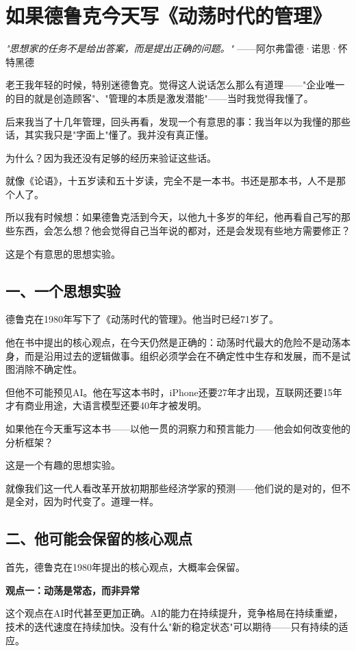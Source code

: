 \chapter{如果德鲁克今天写《动荡时代的管理》}


\textit{"思想家的任务不是给出答案，而是提出正确的问题。"}
——阿尔弗雷德·诺思·怀特黑德


老王我年轻的时候，特别迷德鲁克。觉得这人说话怎么那么有道理——"企业唯一的目的就是创造顾客"、"管理的本质是激发潜能"——当时我觉得我懂了。

后来我当了十几年管理，回头再看，发现一个有意思的事：我当年以为我懂的那些话，其实我只是"字面上"懂了。我并没有真正懂。

为什么？因为我还没有足够的经历来验证这些话。

就像《论语》，十五岁读和五十岁读，完全不是一本书。书还是那本书，人不是那个人了。

所以我有时候想：如果德鲁克活到今天，以他九十多岁的年纪，他再看自己写的那些东西，会怎么想？他会觉得自己当年说的都对，还是会发现有些地方需要修正？

这是个有意思的思想实验。

\section{一、一个思想实验}


德鲁克在1980年写下了《动荡时代的管理》。他当时已经71岁了。

他在书中提出的核心观点，在今天仍然是正确的：动荡时代最大的危险不是动荡本身，而是沿用过去的逻辑做事。组织必须学会在不确定性中生存和发展，而不是试图消除不确定性。

但他不可能预见AI。他在写这本书时，iPhone还要27年才出现，互联网还要15年才有商业用途，大语言模型还要40年才被发明。

如果他在今天重写这本书——以他一贯的洞察力和预言能力——他会如何改变他的分析框架？

这是一个有趣的思想实验。

就像我们这一代人看改革开放初期那些经济学家的预测——他们说的是对的，但不是全对，因为时代变了。道理一样。

\section{二、他可能会保留的核心观点}


首先，德鲁克在1980年提出的核心观点，大概率会保留。

\textbf{观点一：动荡是常态，而非异常}

这个观点在AI时代甚至更加正确。AI的能力在持续提升，竞争格局在持续重塑，技术的迭代速度在持续加快。没有什么"新的稳定状态"可以期待——只有持续的适应。

